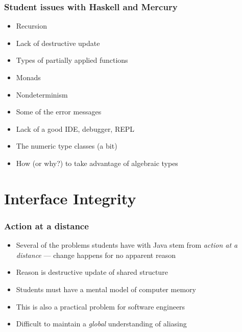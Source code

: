 \documentclass[12pt]{beamer}
\begin{document}
\begin{frame}
\frametitle{Student issues with Haskell and Mercury}
\begin{itemize}
\item Recursion
\item Lack of destructive update
\item Types of partially applied functions
\item Monads
\item Nondeterminism
\item Some of the error messages
\item Lack of a good IDE, debugger, REPL
\item The numeric type classes (a bit)
\item How (or why?) to take advantage of algebraic types
\end{itemize}

\end{frame}


\section{Interface Integrity}

\begin{frame}
\frametitle{Action at a distance}
\begin{itemize}
\item Several of the problems students have with Java stem from
  \emph{action at a distance} --- change happens for no apparent reason
\item Reason is destructive update of shared structure
\item Students must have a mental model of computer memory
\item This is also a practical problem for software engineers
\item Difficult to maintain a \emph{global} understanding of aliasing

\end{itemize}

\end{frame}
\end{document}
